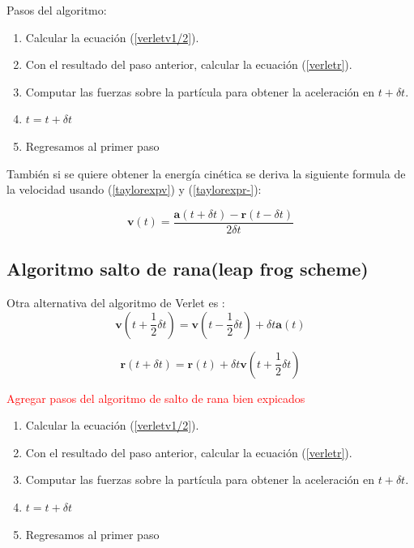 Pasos del algoritmo:

\begin{enumerate}
    \item Calcular la ecuación (\ref{verletv1/2}).
    \item Con el resultado del paso anterior, calcular la ecuación (\ref{verletr}).
    \item Computar las fuerzas sobre la partícula para obtener la aceleración en $t + \delta t$.
    \item $t = t + \delta t$
    \item Regresamos al primer paso
\end{enumerate}

También si se quiere obtener la energía cinética se deriva la siguiente formula de la velocidad usando (\ref{taylorexpv}) y (\ref{taylorexpr-}):

\begin{equation}
    \mathbf{v}(t)=\frac{\mathbf{a}(t + \delta t)-\mathbf{r}(t - \delta t)}{2\delta t}
\end{equation}

\subsection{Algoritmo salto de rana(leap frog scheme)}

Otra alternativa del algoritmo de Verlet es \cite{Allen2017}:\\

\begin{equation} \label{leapfrogv1/2}
    \mathbf{v}(t + \frac{1}{2}\delta t)=\mathbf{v}(t - \frac{1}{2}\delta t)+\delta t\mathbf{a}(t)
\end{equation}

\begin{equation} \label{leapfrogr}
    \mathbf{r}(t + \delta t)= \mathbf{r}(t)+\delta t \mathbf{v}(t+\frac{1}{2}\delta t)
\end{equation}

\textcolor{red}{Agregar pasos del algoritmo de salto de rana bien expicados}

\begin{enumerate}
    \item Calcular la ecuación (\ref{verletv1/2}).
    \item Con el resultado del paso anterior, calcular la ecuación (\ref{verletr}).
    \item Computar las fuerzas sobre la partícula para obtener la aceleración en $t + \delta t$.
    \item $t = t + \delta t$
    \item Regresamos al primer paso
\end{enumerate}

